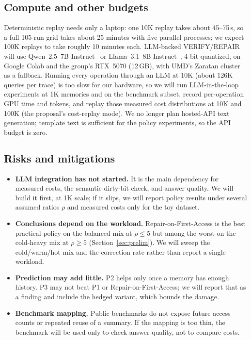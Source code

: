 \documentclass{article}
\begin{document}
\subsection{Compute and other budgets}
Deterministic replay needs only a laptop: one 10K replay takes about
45--75\,s, so a full 105-run grid takes about 25 minutes with five parallel
processes; we expect 100K replays to take roughly 10 minutes each. LLM-backed VERIFY/REPAIR will
use Qwen~2.5~7B Instruct~\citep{qwen2024qwen25} or Llama~3.1~8B
Instruct~\citep{grattafiori2024llama3}, 4-bit quantized, on Google Colab and
the group's RTX~5070 (12\,GB), with UMD's Zaratan cluster as a fallback. Running every
operation through an LLM at 10K (about 126K queries per trace) is too slow
for our hardware, so we will run LLM-in-the-loop experiments at 1K memories and
on the benchmark subset, record per-operation GPU time and tokens, and replay
those measured cost distributions at 10K and 100K (the proposal's cost-replay
mode). We no longer plan hosted-API text generation; template text is
sufficient for the policy experiments, so the API budget is zero.

\subsection{Risks and mitigations}
\begin{itemize}
\item \textbf{LLM integration has not started.} It is the main dependency for
measured costs, the semantic dirty-bit check, and answer quality. We will build
it first, at 1K scale; if it slips, we will report policy results under several
assumed ratios $\rho$ and measured costs only for the toy dataset.
\item \textbf{Conclusions depend on the workload.} Repair-on-First-Access is
the best practical policy on the balanced mix at $\rho\le5$ but among the
worst on the cold-heavy mix at $\rho\ge5$ (Section~\ref{sec:prelim}). We will
sweep the cold/warm/hot mix and the correction rate rather than report a single
workload.
\item \textbf{Prediction may add little.} P2 helps only once a memory has
enough history. P3 may not beat P1 or Repair-on-First-Access; we will report
that as a finding and include the hedged variant, which bounds the damage.
\item \textbf{Benchmark mapping.} Public benchmarks do not expose future access
counts or repeated reuse of a summary. If the mapping is too thin, the
benchmark will be used only to check answer quality, not to compare costs.
\end{itemize}
\end{document}
